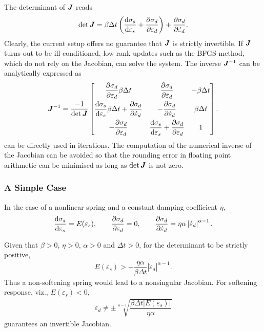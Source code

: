 The determinant of $\bm{J}$ reads
\begin{gather}
\det{\bm{J}}=\beta\Delta{}t\left(\dfrac{\mathrm{d}\sigma_s}{\mathrm{d}\varepsilon_s}+\dfrac{\partial{\sigma_d}}{\partial{\varepsilon_d}}\right)+\dfrac{\partial{\sigma_d}}{\partial{\dot\varepsilon_d}}.
\end{gather}
Clearly, the current setup offers no guarantee that $\bm{J}$ is strictly invertible.
If $\bm{J}$ turns out to be ill-conditioned, low rank updates such as the BFGS method, which do not rely on the Jacobian, can solve the system.
The inverse $\bm{J}^{-1}$ can be analytically expressed as
\begin{gather}\label{eq:inv_j}
\bm{J}^{-1}=\dfrac{-1}{\det{\bm{J}}}\begin{bmatrix}
	\dfrac{\partial{\sigma_d}}{\partial{\varepsilon_d}}\beta\Delta{}t                                               & \dfrac{\partial{\sigma_d}}{\partial{\dot\varepsilon_d}}                                       & -\beta\Delta{}t \\[3mm]
	\dfrac{\mathrm{d}\sigma_s}{\mathrm{d}\varepsilon_s}\beta\Delta{}t+\dfrac{\partial{\sigma_d}}{\partial{\dot\varepsilon_d}} & -\dfrac{\partial{\sigma_d}}{\partial{\dot\varepsilon_d}}                                      & \beta\Delta{}t  \\[3mm]
	-\dfrac{\partial{\sigma_d}}{\partial{\varepsilon_d}}                                                            & \dfrac{\mathrm{d}\sigma_s}{\mathrm{d}\varepsilon_s}+\dfrac{\partial{\sigma_d}}{\partial{\varepsilon_d}} & 1
\end{bmatrix}.
\end{gather}
 can be directly used in iterations.
The computation of the numerical inverse of the Jacobian can be avoided so that the rounding error in floating point arithmetic can be minimised as long as $\det{\bm{J}}$ is not zero.
\subsubsection{A Simple Case}
In the case of a nonlinear spring and a constant damping coefficient $\eta$,
\begin{gather}
\dfrac{\mathrm{d}\sigma_s}{\mathrm{d}\varepsilon_s}=E(\varepsilon_s),\qquad\dfrac{\partial{\sigma_d}}{\partial{\varepsilon_d}}=0,\qquad\dfrac{\partial{\sigma_d}}{\partial{\dot\varepsilon_d}}=\eta\alpha\left\lvert\dot\varepsilon_d\right\rvert^{\alpha-1}.
\end{gather}

Given that $\beta>0$, $\eta>0$, $\alpha>0$ and $\Delta{}t>0$, for the determinant to be strictly positive,
\begin{gather}
E(\varepsilon_s)>-\dfrac{\eta\alpha}{\beta\Delta{}t}\left\lvert\dot\varepsilon_d\right\rvert^{\alpha-1}.
\end{gather}
Thus a non-softening spring would lead to a nonsingular Jacobian.
For softening response, viz., $E(\varepsilon_s)<0$,
\begin{gather}
\dot\varepsilon_d\neq\pm\sqrt[\alpha-1]{\dfrac{\beta\Delta{}t{}\left\lvert{}E(\varepsilon_s)\right\rvert}{\eta\alpha}}
\end{gather}
guarantees an invertible Jacobian.

